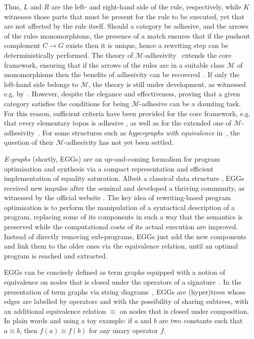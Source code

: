 \documentclass[3p]{elsarticle}
\theoremstyle{remark}
\theoremstyle{definition}
\begin{document}
Thus, $L$ and $R$ are the left- and right-hand side of the rule, respectively, while $K$ witnesses those parts that must 
be present for the rule to be executed, yet that are not affected by the rule itself.
%
Should a category be adhesive, and the arrows of the rules monomorphisms, the presence of a match ensures that
if the pushout complement $C \to G$ exists then it is unique, hence a rewriting step can be deterministically performed.
%
The theory of $\mathcal{M}$-adhesivity~\cite{azzi2019essence,heindel2009category} extends the core framework, ensuring that if the arrows 
of the rules are in a suitable class $\mathcal{M}$ of monomorphisms
then the benefits of adhesivity
can be recovered~\cite{ehrig2012,ehrig2014adhesive}. 
If only the left-hand side belongs to $\mathcal{M}$, the theory is still under development, as witnessed e.g.
by~\cite{BaldanC0G24}.
%
However, despite the elegance and effectiveness,
proving that a given category satisfies the conditions 
for being $\mathcal{M}$-adhesive can be a daunting task. For this reason, sufficient criteria have been provided for the core 
framework, e.g. that every elementary topos is adhesive \cite{lack2006toposes}, as well as for the extended one of
$\mathcal{M}$-adhesivity~\cite{CastelnovoGM24}.
%
For some structures such as \emph{hypergraphs with equivalence} in~\cite{concur2006}, the question 
of their $\mathcal{M}$-adhesivity has not yet been settled.

\emph{E-graphs} (shortly, EGGs) are an up-and-coming formalism for program optimisation and synthesis via a compact 
representation and efficient implementation of equality saturation. Albeit a classical data structure \cite{DetlefsNS05}, EGGs received 
new impulse after the seminal \cite{WillseyNWFTP21} and
developed a thriving community, as witnessed by the official website \cite{eggs}.
%
The key idea of rewriting-based program optimisation is to perform the manipulation of a syntactical description 
of a program, replacing some of its components in such a way that the semantics is preserved while 
the computational costs of its actual execution are improved. Instead of directly removing sub-programs, EGGs just add the 
new components and link them to the older ones via the equivalence relation, until an optimal program is 
reached and extracted.

EGGs can be concisely defined as term graphs equipped with a notion of equivalence on nodes
that is closed under the operators of a signature~\cite[Section~4.2]{DetlefsNS05}.
In the presentation of term graphs via string diagrams~\cite{CastelnovoGM24}, EGGs are (hyper)trees 
whose edges are labelled by operators and with
the possibility of sharing subtrees, with an additional equivalence relation $\equiv$ on nodes that 
is closed under composition. In plain words and using a toy example:
if $a$ and $b$ are two constants such that $a \equiv b$, then $f(a) \equiv f(b)$ for any unary operator $f$.
\end{document}
